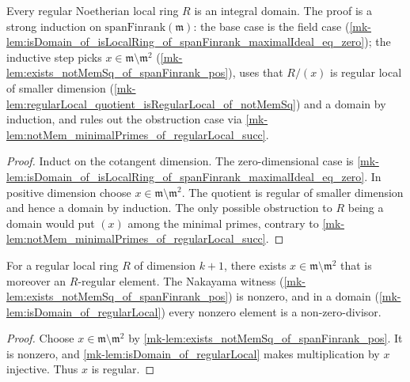 \begin{lemma}\label{mk-lem:isDomain_of_regularLocal}
  \leanok

  Every regular Noetherian local ring \(R\) is an integral domain. The proof is a strong
  induction on \(\text{spanFinrank}(\mathfrak m)\): the base case is the field case
  (\ref{mk-lem:isDomain_of_isLocalRing_of_spanFinrank_maximalIdeal_eq_zero}); the inductive
  step picks \(x \in \mathfrak m \setminus \mathfrak m^2\)
  (\ref{mk-lem:exists_notMemSq_of_spanFinrank_pos}), uses that \(R/(x)\) is regular local of
  smaller dimension (\ref{mk-lem:regularLocal_quotient_isRegularLocal_of_notMemSq}) and a
  domain by induction, and rules out the obstruction case via
  \ref{mk-lem:notMem_minimalPrimes_of_regularLocal_succ}.
\end{lemma}
\begin{proof}
  \leanok

Induct on the cotangent dimension. The zero-dimensional case is
  \ref{mk-lem:isDomain_of_isLocalRing_of_spanFinrank_maximalIdeal_eq_zero}.
  In positive dimension choose \(x\in\mathfrak m\setminus\mathfrak m^2\).
  The quotient is regular of smaller dimension and hence a domain by
  induction. The only possible obstruction to \(R\) being a domain would
  put \((x)\) among the minimal primes, contrary to
  \ref{mk-lem:notMem_minimalPrimes_of_regularLocal_succ}.
\end{proof}

\begin{lemma}\label{mk-lem:exists_isSMulRegular_notMemSq_of_regularLocal_succ}
  \leanok

  For a regular local ring \(R\) of dimension \(k + 1\), there exists
  \(x \in \mathfrak m \setminus \mathfrak m^2\) that is moreover an \(R\)-regular element. The
  Nakayama witness (\ref{mk-lem:exists_notMemSq_of_spanFinrank_pos}) is nonzero, and in a
  domain (\ref{mk-lem:isDomain_of_regularLocal}) every nonzero element is a
  non-zero-divisor.
\end{lemma}
\begin{proof}
  \leanok

Choose \(x\in\mathfrak m\setminus\mathfrak m^2\) by
  \ref{mk-lem:exists_notMemSq_of_spanFinrank_pos}. It is nonzero, and
  \ref{mk-lem:isDomain_of_regularLocal} makes multiplication by \(x\)
  injective. Thus \(x\) is regular.
\end{proof}

